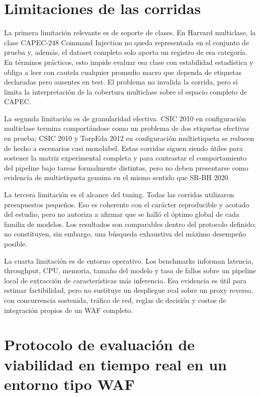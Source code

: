 \documentclass[12pt,oneside]{report}
\begin{document}
\section{Limitaciones de las corridas}
La primera limitación relevante es de soporte de clases. En Harvard multiclase, la clase CAPEC-248 Command Injection no queda representada en el conjunto de prueba y, además, el dataset completo solo aporta un registro de esa categoría. En términos prácticos, esto impide evaluar esa clase con estabilidad estadística y obliga a leer con cautela cualquier promedio macro que dependa de etiquetas declaradas pero ausentes en test. El problema no invalida la corrida, pero sí limita la interpretación de la cobertura multiclase sobre el espacio completo de CAPEC.\

La segunda limitación es de granularidad efectiva. CSIC 2010 en configuración multiclase termina comportándose como un problema de dos etiquetas efectivas en prueba; CSIC 2010 y TorpEda 2012 en configuración multietiqueta se reducen de hecho a escenarios casi monolabel. Estas corridas siguen siendo útiles para sostener la matriz experimental completa y para contrastar el comportamiento del pipeline bajo tareas formalmente distintas, pero no deben presentarse como evidencia de multietiqueta genuina en el mismo sentido que SR-BH 2020.\

La tercera limitación es el alcance del tuning. Todas las corridas utilizaron presupuestos pequeños. Eso es coherente con el carácter reproducible y acotado del estudio, pero no autoriza a afirmar que se halló el óptimo global de cada familia de modelos. Los resultados son comparables dentro del protocolo definido; no constituyen, sin embargo, una búsqueda exhaustiva del máximo desempeño posible.\

La cuarta limitación es de entorno operativo. Los benchmarks informan latencia, throughput, CPU, memoria, tamaño del modelo y tasa de fallos sobre un pipeline local de extracción de características más inferencia. Esa evidencia es útil para estimar factibilidad, pero no sustituye un despliegue real sobre un proxy reverso, con concurrencia sostenida, tráfico de red, reglas de decisión y costos de integración propios de un WAF completo.\


\section{Protocolo de evaluación de viabilidad en tiempo real en un entorno tipo WAF}
\end{document}
